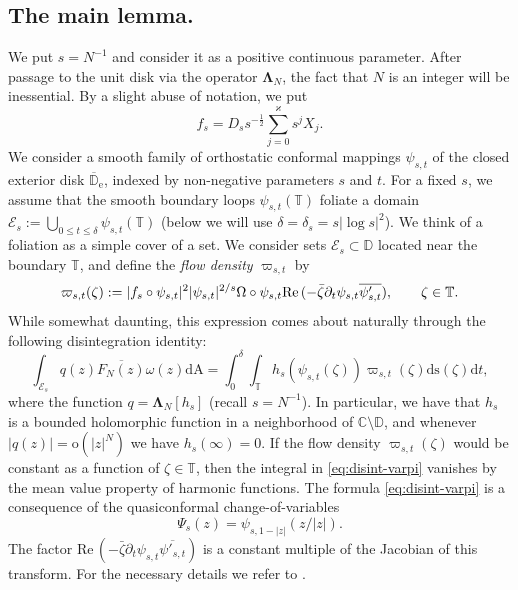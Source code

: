 \documentclass{amsart}
\newcommand{\be}{\begin{equation}}
\newcommand{\ee}{\end{equation}}
\newcommand{\C}{\mathbb{C}}
\newcommand{\D}{\mathbb{D}}
\newcommand{\T}{\mathbb{T}}
\newcommand{\calE}{\mathcal{E}}
\newcommand{\diffA}{\mathrm{dA}}
\newcommand{\diffs}{\mathrm{ds}}
\newcommand{\diff}{\mathrm{d}}
\newcommand{\Lamop}{\mathbf{\Lambda}}
\theoremstyle{definition}
\theoremstyle{remark}
\newcommand{\e}{\mathrm{e}}
\newcommand{\ordo}{\mathrm{o}}
\renewcommand{\Re}{\mathrm{Re}\,}
\numberwithin{equation}{subsection}
\begin{document}
\subsection{The main lemma.}
We put $s=N^{-1}$ and consider it
as a positive continuous parameter. After passage to
the unit disk via the operator $\Lamop_N$, the fact that $N$
is an integer will be inessential.
By a slight abuse of notation, we put 
\be\label{eq:def-fs}
f_s=D_s s^{-\frac12}\sum_{j=0}^{\varkappa}s^j X_j.
\ee
We consider a smooth family of orthostatic conformal 
mappings $\psi_{s,t}$
of the closed exterior disk $\overline{\D}_\e$,
indexed by non-negative parameters $s$ and $t$. For a fixed $s$,
we assume that the smooth boundary loops $\psi_{s,t}(\T)$ 
foliate a domain $\calE_s:=\bigcup_{0\le t \le \delta}\psi_{s,t}(\T)$ 
(below we will use $\delta=\delta_s=s|\log s|^2$). 
We think of a foliation as a simple cover of a set.
We consider sets $\calE_s\subset\D$ located near the boundary $\T$, 
and define the {\em flow density} $\varpi_{s,t}$ by
\be\label{eq:def-flow-density}
\varpi_{s,t}(\zeta):=|f_s\circ\psi_{s,t}|^2 \\
|\psi_{s,t}|^{2/s}\Omega\circ\psi_{s,t}
\Re(-\bar{\zeta}\partial_t\psi_{s,t}\overline{\psi_{s,t}'}),\qquad \zeta\in\T.
\ee
While somewhat daunting, this expression comes about naturally 
through the following disintegration identity:
\be\label{eq:disint-varpi}
\int_{\calE_s}q(z)\overline{F_N(z)}\omega(z)\diffA
=\int_{0}^{\delta}\int_\T h_{s}(\psi_{s,t}(\zeta))\varpi_{s,t}(\zeta)
\diffs(\zeta)\diff t,
\ee
where the function $q=\Lamop_N[h_{s}]$ (recall $s=N^{-1}$).
In particular, we have that $h_s$ is a bounded holomorphic function
in a neighborhood of $\C\setminus\D$, and whenever $|q(z)|=\ordo(|z|^{N})$ 
we have $h_s(\infty)=0$.
If the flow density $\varpi_{s,t}(\zeta)$ would be
constant as a function of $\zeta\in\T$,
then the integral in \eqref{eq:disint-varpi} 
vanishes by the mean value
property of harmonic functions.
The formula \eqref{eq:disint-varpi} is a 
consequence of the quasiconformal change-of-variables
\[
\Psi_s(z)=\psi_{s,1-|z|}(z/|z|).
\]
The factor
$\Re(-\bar\zeta\partial_t\psi_{s,t}\overline{\psi'_{s,t}})$
is a constant multiple of the Jacobian of this transform.
For the necessary details we refer to 
\cite[Subsection~3.4]{HW-ONP}.
\end{document}
